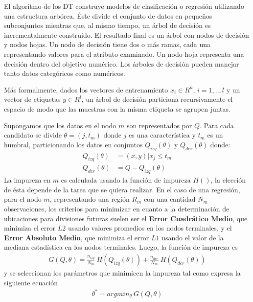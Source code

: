   \par El algoritmo de los DT construye modelos de clasificación o regresión
    utilizando una estructura arbórea. Éste divide el conjunto de datos en pequeños
    subconjuntos mientras que, al mismo tiempo, un árbol de decisión es incrementalmente
    construido. El resultado final es un árbol con nodos de decisión y nodos hojas.
    Un nodo de decisión tiene dos o más ramas, cada una representando valores para
    el atributo examinado. Un nodo hoja representa una decisión dentro del
    objetivo numérico. Los árboles de decisión pueden manejar tanto datos
    categóricos como numéricos.


  \par Más formalmente, dados los vectores de entrenamiento $x_{i} \in R^{n}$, $i = 1,..,l$
    y un vector de etiquetas $y \in R^{l}$, un árbol de decisión particiona
    recursivamente el espacio de modo que las muestras con la misma etiqueta se agrupen juntas.


  \par Supongamos que los datos en el nodo $m$ son representados por $Q$. Para cada
    candidato se divide $\theta = (j, t_{m})$ donde $j$ es una característica y
    $t_{m}$ es un humbral, particionando los datos en conjuntos $Q_{izq}(\theta)$ y
    $Q_{der}(\theta)$ donde:
    \begin{align}
      Q_{izq}(\theta) &= (x, y) | x_{j} \leq t_m \\
      Q_{der}(\theta) &= Q - Q_{izq}(\theta)
    \end{align}
    La impureza en $m$ es calculada usando la función de impureza $H()$, la elección
    de ésta depende de la tarea que se quiera realizar.
    En el caso de una regresión, para el nodo $m$, representando una
    región $R_{m}$ con una cantidad $N_{m}$ observaciones, los criterios
    para minimizar en cuanto a la determinación de ubicaciones para divisiones
    futuras suelen ser el \textbf{Error Cuadrático Medio}, que minimiza el error $L2$ usando
    valores promedios en los nodos terminales, y el \textbf{Error Absoluto Medio}, que minimiza
    el error $L1$ usando el valor de la mediana estadística en los nodos terminales.
    Luego, la función de impureza es
    \begin{align}
      G(Q, \theta) = \frac{n_{izq}}{N_{m}} \ H(Q_{izq}(\theta)) + \frac{n_{der}}{N_{m}} \ H(Q_{der}(\theta))
    \end{align}
    y se seleccionan los parámetros que minimicen la impureza tal como expresa la
    siguiente ecuación
    \begin{align}
      \theta^{*} = argmin_{\theta} \ G(Q, \theta)
    \end{align}

